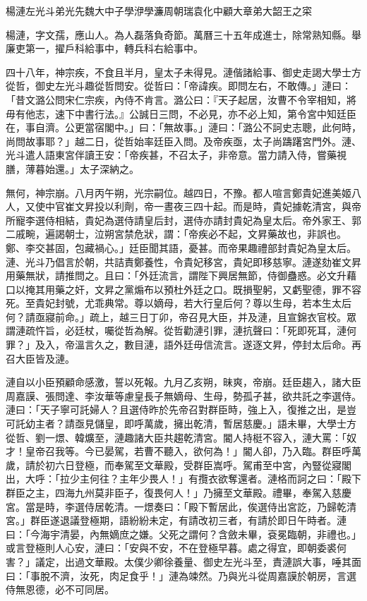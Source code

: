 
\begin{pinyinscope}
楊漣左光斗弟光先魏大中子學洢學濂周朝瑞袁化中顧大章弟大韶王之寀

楊漣，字文孺，應山人。為人磊落負奇節。萬曆三十五年成進士，除常熟知縣。舉廉吏第一，擢戶科給事中，轉兵科右給事中。

四十八年，神宗疾，不食且半月，皇太子未得見。漣偕諸給事、御史走謁大學士方從哲，御史左光斗趣從哲問安。從哲曰：「帝諱疾。即問左右，不敢傳。」漣曰：「昔文潞公問宋仁宗疾，內侍不肯言。潞公曰：『天子起居，汝曹不令宰相知，將毋有他志，速下中書行法。』公誠日三問，不必見，亦不必上知，第令宮中知廷臣在，事自濟。公更當宿閣中。」曰：「無故事。」漣曰：「潞公不訶史志聰，此何時，尚問故事耶？」越二日，從哲始率廷臣入問。及帝疾亟，太子尚躊躇宮門外。漣、光斗遣人語東宮伴讀王安：「帝疾甚，不召太子，非帝意。當力請入侍，嘗藥視膳，薄暮始還。」太子深納之。

無何，神宗崩。八月丙午朔，光宗嗣位。越四日，不豫。都人喧言鄭貴妃進美姬八人，又使中官崔文昇投以利劑，帝一晝夜三四十起。而是時，貴妃據乾清宮，與帝所寵李選侍相結，貴妃為選侍請皇后封，選侍亦請封貴妃為皇太后。帝外家王、郭二戚畹，遍謁朝士，泣朔宮禁危狀，謂：「帝疾必不起，文昇藥故也，非誤也。鄭、李交甚固，包藏禍心。」廷臣聞其語，憂甚。而帝果趣禮部封貴妃為皇太后。漣、光斗乃倡言於朝，共詰責鄭養性，令貴妃移宮，貴妃即移慈寧。漣遂劾崔文昇用藥無狀，請推問之。且曰：「外廷流言，謂陛下興居無節，侍御蠱惑。必文升藉口以掩其用藥之奸，文昇之黨煽布以預杜外廷之口。既損聖躬，又虧聖德，罪不容死。至貴妃封號，尤乖典常。尊以嫡母，若大行皇后何？尊以生母，若本生太后何？請亟寢前命。」疏上，越三日丁卯，帝召見大臣，并及漣，且宣錦衣官校。眾謂漣疏忤旨，必廷杖，囑從哲為解。從哲勸漣引罪，漣抗聲曰：「死即死耳，漣何罪？」及入，帝溫言久之，數目漣，語外廷毋信流言。遂逐文昇，停封太后命。再召大臣皆及漣。

漣自以小臣預顧命感激，誓以死報。九月乙亥朔，昧爽，帝崩。廷臣趨入，諸大臣周嘉謨、張問達、李汝華等慮皇長子無嫡母、生母，勢孤孑甚，欲共託之李選侍。漣曰：「天子寧可託婦人？且選侍昨於先帝召對群臣時，強上入，復推之出，是豈可託幼主者？請亟見儲皇，即呼萬歲，擁出乾清，暫居慈慶。」語未畢，大學士方從哲、劉一燝、韓爌至，漣趣諸大臣共趨乾清宮。閽人持梃不容入，漣大罵：「奴才！皇帝召我等。今已晏駕，若曹不聽入，欲何為！」閽人卻，乃入臨。群臣呼萬歲，請於初六日登極，而奉駕至文華殿，受群臣嵩呼。駕甫至中宮，內豎從寢閣出，大呼：「拉少主何往？主年少畏人！」有攬衣欲奪還者。漣格而訶之曰：「殿下群臣之主，四海九州莫非臣子，復畏何人！」乃擁至文華殿。禮畢，奉駕入慈慶宮。當是時，李選侍居乾清。一燝奏曰：「殿下暫居此，俟選侍出宮訖，乃歸乾清宮。」群臣遂退議登極期，語紛紛未定，有請改初三者，有請於即日午時者。漣曰：「今海宇清晏，內無嫡庶之嫌。父死之謂何？含斂未畢，袞冕臨朝，非禮也。」或言登極則人心安，漣曰：「安與不安，不在登極早暮。處之得宜，即朝委裘何害？」議定，出過文華殿。太僕少卿徐養量、御史左光斗至，責漣誤大事，唾其面曰：「事脫不濟，汝死，肉足食乎！」漣為竦然。乃與光斗從周嘉謨於朝房，言選侍無恩德，必不可同居。


\end{pinyinscope}
